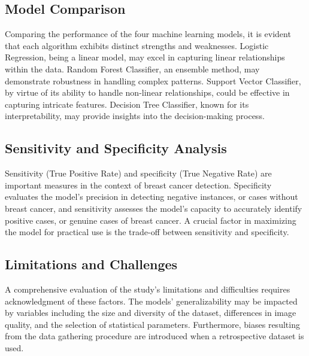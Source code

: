 \subsection{Model Comparison}
Comparing the performance of the four machine learning models, it is evident that each algorithm exhibits distinct strengths and weaknesses. Logistic Regression, being a linear model, may excel in capturing linear relationships within the data. Random Forest Classifier, an ensemble method, may demonstrate robustness in handling complex patterns. Support Vector Classifier, by virtue of its ability to handle non-linear relationships, could be effective in capturing intricate features. Decision Tree Classifier, known for its interpretability, may provide insights into the decision-making process.

\subsection{Sensitivity and Specificity Analysis}
Sensitivity (True Positive Rate) and specificity (True Negative Rate) are important measures in the context of breast cancer detection. Specificity evaluates the model's precision in detecting negative instances, or cases without breast cancer, and sensitivity assesses the model's capacity to accurately identify positive cases, or genuine cases of breast cancer. A crucial factor in maximizing the model for practical use is the trade-off between sensitivity and specificity.

\subsection{Limitations and Challenges}
A comprehensive evaluation of the study's limitations and difficulties requires acknowledgment of these factors. The models' generalizability may be impacted by variables including the size and diversity of the dataset, differences in image quality, and the selection of statistical parameters. Furthermore, biases resulting from the data gathering procedure are introduced when a retrospective dataset is used.